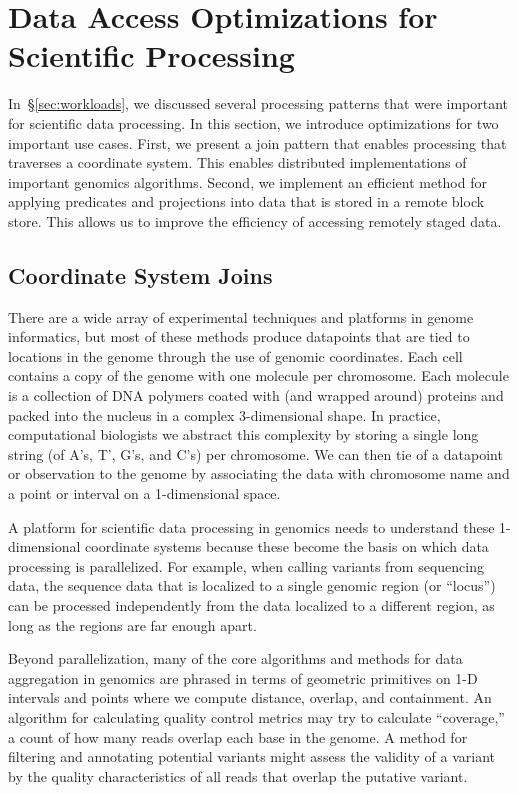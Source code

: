 \documentclass{acm_proc_article-sp}
\begin{document}
\section{Data Access Optimizations for \\ Scientific Processing}
\label{sec:optimizations-scientific-processing}

In~\S\ref{sec:workloads}, we discussed several processing patterns that were important for scientific
data processing. In this section, we introduce optimizations for two important use cases. First, we present
a join pattern that enables processing that traverses a coordinate system. This enables distributed
implementations of important genomics algorithms. Second, we implement an efficient method for
applying predicates and projections into data that is stored in a remote block store. This allows us to
improve the efficiency of accessing remotely staged data.

\subsection{Coordinate System Joins}
\label{sec:coordinate-system-joins}

There are a wide array of experimental techniques and platforms in genome informatics, but most of these
methods produce datapoints that are tied to locations in the genome through the use of genomic coordinates.
Each cell contains a copy of the genome with one molecule per chromosome. Each molecule is a collection of
DNA polymers coated with (and wrapped around) proteins and packed into the nucleus in a complex
3-dimensional shape. In practice, computational biologists we abstract this complexity by storing a single long
string (of A's, T', G's, and C's) per chromosome. We can then tie of a datapoint or observation to the genome by
associating the data with chromosome name and a point or interval on a 1-dimensional space.

A platform for scientific data processing in genomics needs to understand these 1-dimensional coordinate
systems because these become the basis on which data processing is parallelized. For example, when calling
variants from sequencing data, the sequence data that is localized to a single genomic region (or ``locus'') can be 
processed independently from the data localized to a different region, as long as the regions are far enough
apart.

Beyond parallelization, many of the core algorithms and methods for data aggregation in genomics are phrased
in terms of geometric primitives on 1-D intervals and points where we compute distance, overlap, and
containment.  An algorithm for calculating quality control metrics may try to calculate ``coverage,'' a count
of how many reads overlap each base in the genome. A method for filtering and annotating potential variants
might assess the validity of a variant by the quality characteristics of all reads that overlap the putative variant.
\end{document}
